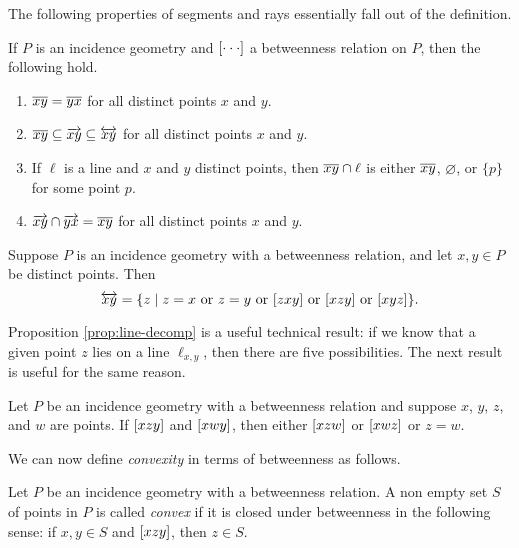 The following properties of segments and rays essentially fall out of the definition.

\begin{prop}
If \(P\) is an incidence geometry and \([ \cdot \cdot \cdot ]\) a betweenness relation on \(P\), then the following hold.
\begin{enumerate}
\item \(\overline{xy} = \overline{yx}\) for all distinct points \(x\) and \(y\).
\item \(\overline{xy} \subseteq \overrightarrow{xy} \subseteq \overleftrightarrow{xy}\) for all distinct points \(x\) and \(y\).
\item If \(\ell\) is a line and \(x\) and \(y\) distinct points, then \(\overline{xy} \cap \ell\) is either \(\overline{xy}\), \(\varnothing\), or \(\{p\}\) for some point \(p\).
\item \(\overrightarrow{xy} \cap \overrightarrow{yx} = \overline{xy}\) for all distinct points \(x\) and \(y\).
\end{enumerate}
\end{prop}



\begin{prop}\label{prop:line-decomp}
Suppose \(P\) is an incidence geometry with a betweenness relation, and let \(x,y \in P\) be distinct points.
Then \[ \LINE{x}{y} = \{ z \mid z = x\ \mathrm{or}\ z = y\ \mathrm{or}\ \BETWEEN{z}{x}{y}\ \mathrm{or}\ \BETWEEN{x}{z}{y}\ \mathrm{or}\ \BETWEEN{x}{y}{z} \}. \]
\end{prop}

Proposition \ref{prop:line-decomp} is a useful technical result: if we know that a given point \(z\) lies on a line \(\ell_{x,y}\), then there are five possibilities.
The next result is useful for the same reason.

\begin{prop}
Let \(P\) be an incidence geometry with a betweenness relation and suppose \(x\), \(y\), \(z\), and \(w\) are points.
If \([ x z y ]\) and \([ x w y ]\), then either \([ x z w ]\) or \([ x w z ]\) or \(z = w\).
\end{prop}

We can now define \emph{convexity} in terms of betweenness as follows.

\begin{dfn}[Convexity]
Let \(P\) be an incidence geometry with a betweenness relation.
A non empty set \(S\) of points in \(P\) is called \emph{convex} if it is closed under betweenness in the following sense: if \(x,y \in S\) and \([ x z y ]\), then \(z \in S\).
\end{dfn}



